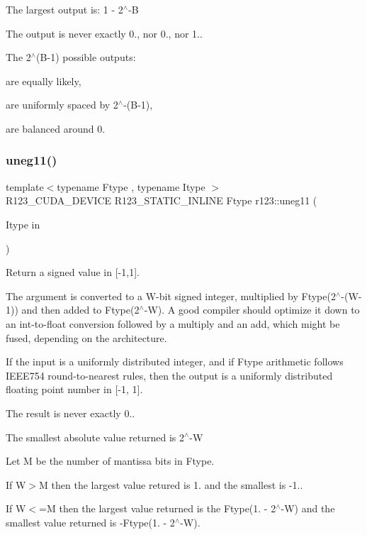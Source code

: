 The largest output is\+: 1 -\/ 2$^\wedge$-\/B

The output is never exactly 0., nor 0., nor 1..

The 2$^\wedge$(B-\/1) possible outputs\+:
\begin{DoxyItemize}
\item are equally likely,
\item are uniformly spaced by 2$^\wedge$-\/(B-\/1),
\item are balanced around 0. 
\end{DoxyItemize}\hypertarget{group__uniform_ga49eb4e2f3522f1b5e22b66bdc86345ce}{}\label{group__uniform_ga49eb4e2f3522f1b5e22b66bdc86345ce} 
\subsubsection{\texorpdfstring{uneg11()}{uneg11()}}
{\footnotesize\ttfamily template$<$typename Ftype , typename Itype $>$ \\
R123\+\_\+\+C\+U\+D\+A\+\_\+\+D\+E\+V\+I\+CE R123\+\_\+\+S\+T\+A\+T\+I\+C\+\_\+\+I\+N\+L\+I\+NE Ftype r123\+::uneg11 (\begin{DoxyParamCaption}\item[{Itype}]{in }\end{DoxyParamCaption})}



Return a signed value in \mbox{[}-\/1,1\mbox{]}. 

The argument is converted to a W-\/bit signed integer, multiplied by Ftype(2$^\wedge$-\/(W-\/1)) and then added to Ftype(2$^\wedge$-\/W). A good compiler should optimize it down to an int-\/to-\/float conversion followed by a multiply and an add, which might be fused, depending on the architecture.

If the input is a uniformly distributed integer, and if Ftype arithmetic follows I\+E\+E\+E754 round-\/to-\/nearest rules, then the output is a uniformly distributed floating point number in \mbox{[}-\/1, 1\mbox{]}.


\begin{DoxyItemize}
\item The result is never exactly 0..
\item The smallest absolute value returned is 2$^\wedge$-\/W
\item Let M be the number of mantissa bits in Ftype.
\begin{DoxyItemize}
\item If W$>$M then the largest value retured is 1. and the smallest is -\/1..
\item If W$<$=M then the largest value returned is the Ftype(1. -\/ 2$^\wedge$-\/W) and the smallest value returned is -\/\+Ftype(1. -\/ 2$^\wedge$-\/W). 
\end{DoxyItemize}
\end{DoxyItemize}